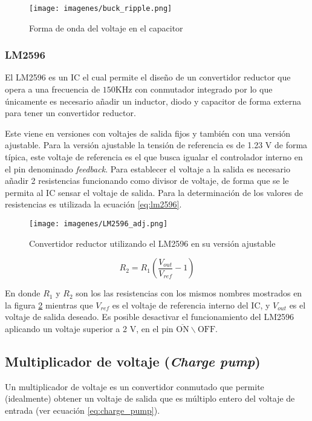 \begin{figure} [H]
    \centering
    \texttt{[image: imagenes/buck\_ripple.png]}
    \caption{Forma de onda del voltaje en el capacitor \cite{erickson_fundamentals_2020}}
    \label{fig:ripple_C}
\end{figure}

\subsubsection{LM2596}

 El LM2596 es un IC el cual permite el diseño de un convertidor reductor que opera a una 
 frecuencia de $150\text{KHz}$ con conmutador integrado
por lo que únicamente es necesario añadir un inductor, diodo y capacitor de 
 forma externa para tener un convertidor reductor. 
 
 Este viene en versiones con voltajes de 
 salida fijos y también con una versión ajustable.  Para la versión ajustable la tensión de
 referencia es de 1.23 V de forma típica, este voltaje de referencia es el que busca igualar
 el controlador interno en el pin denominado \textit{feedback}. Para establecer el voltaje
 a la salida es necesario añadir 2 resistencias funcionando como divisor de voltaje, 
 de forma que se le permita al IC sensar el voltaje de salida. Para la determinación de los
valores de resistencias es utilizada la ecuación \ref{eq:lm2596}. 

 \begin{figure}[H]
    \centering
    \texttt{[image: imagenes/LM2596\_adj.png]}
    \caption{Convertidor reductor utilizando el LM2596 en su versión ajustable \cite{lm2596}}
    \label{fig:lm2596}
 \end{figure}
 
\begin{equation}
    R_2 = R_1(\frac{V_{out}}{V_{ref}} - 1)
    \label{eq:lm2596}
\end{equation}

En donde $R_1$ y $R_2$ son los las resistencias con los mismos nombres mostrados en la
figura \ref{fig:lm2596} mientras que $V_{ref}$ es el voltaje de referencia interno del
IC, y $V_{out}$ es el voltaje de salida deseado. Es posible desactivar el funcionamiento
del LM2596 aplicando un voltaje superior a 2 V, en el pin 
$\overline{\text{ON}}\backslash\text{OFF}$.

\subsection{Multiplicador de voltaje (\textit{Charge pump})}
    \label{sec:charge_pump}
    Un multiplicador de voltaje es un convertidor conmutado que permite (idealmente)
    obtener un voltaje de salida que es múltiplo entero del voltaje de entrada
    (ver ecuación \ref{eq:charge_pump}).
    

